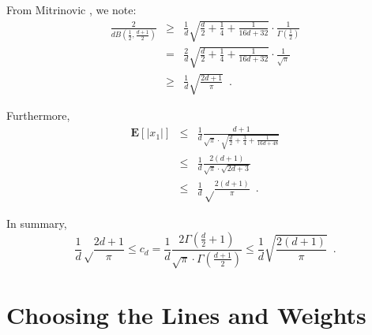 \documentclass[charterfonts,lotsofwhite]{patmorin}
\newcommand{\E}{\mathbf{E}}
\begin{document}
From Mitrinovic \cite[p.~286]{m70}, we note:
\begin{eqnarray}
\frac{2}{dB(\frac{1}{2},\frac{d+1}{2})} & \ge &
  \frac{1}{d}\sqrt{\frac{d}{2}+\frac{1}{4}+\frac{1}{16d+32}}\cdot 
     \frac{1}{\Gamma(\frac{1}{2})} \\
 & = & \frac{2}{d}\sqrt{\frac{d}{2}+\frac{1}{4}+\frac{1}{16d+32}}\cdot
      \frac{1}{\sqrt{\pi}} \\
 & \ge & \frac{1}{d}\sqrt{\frac{2d+1}{\pi}} \enspace .
\end{eqnarray}

Furthermore,
\begin{eqnarray*}
\E\left[|x_1|\right] 
  & \le & \frac{1}{d}\frac{d+1}{\sqrt{\pi}\cdot\sqrt{\frac{d}{2}+
                       \frac{3}{4}+\frac{1}{16d+48}}} \\
  & \le & \frac{1}{d}\frac{2(d+1)}{\sqrt{\pi}\cdot\sqrt{2d+3}} \\ 
  & \le & \frac{1}{d}\sqrt\frac{2(d+1)}{\pi} \enspace . 
\end{eqnarray*}

In summary,
\[
\frac{1}{d}\sqrt\frac{2d+1}{\pi} \le c_d = \frac{1}{d}\frac{2\Gamma(\frac{d}{2}+1)}
                            {\sqrt{\pi}\cdot\Gamma(\frac{d+1}{2})}
 \le \frac{1}{d}\sqrt{\frac{2(d+1)}{\pi}} \enspace .
\]

\section{Choosing the Lines and Weights}
\newcommand{\ccap}{\mathrm{cap}}
\newcommand{\Sd}{\mathbb{S}^{d-1}}
\newcommand{\area}{\mathrm{vol}}
\end{document}
